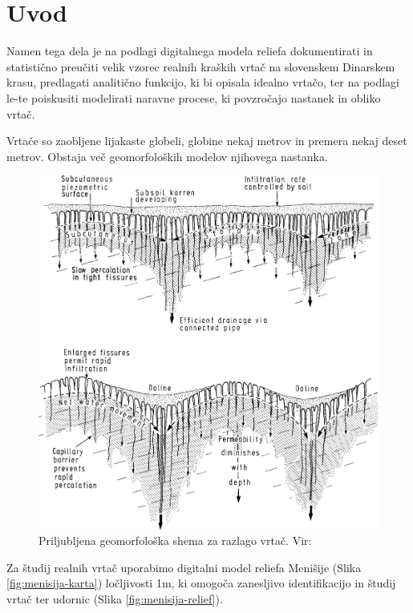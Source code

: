 \documentclass[a4paper, oneside, 12pt]{book}
\begin{document}
\mainmatter
\setcounter{page}{1}
\pagestyle{fancy}

\chapter{Uvod}
\label{ch1}
Namen tega dela je na podlagi digitalnega modela reliefa dokumentirati in statistično preučiti velik vzorec realnih kraških vrtač na slovenskem Dinarskem krasu, predlagati analitično funkcijo, ki bi opisala idealno vrtačo, ter na podlagi le-te poiskusiti modelirati naravne procese, ki povzročajo nastanek in obliko vrtač.

Vrtače so zaobljene lijakaste globeli, globine nekaj metrov in premera nekaj deset metrov. Obstaja več geomorfoloških modelov njihovega nastanka.

\begin{figure}[H]
  \begin{center}
    \includegraphics[width=13cm]{slike/vrtaca-ford-williams}
  \end{center}
  \caption{Priljubljena geomorfološka shema za razlago vrtač. Vir: \cite{ford2007karst}}
  \label{fig:vrtaca-ford-williams}
\end{figure}

Za študij realnih vrtač uporabimo digitalni model reliefa Menišije (Slika \ref{fig:menisija-karta}) ločljivosti 1m, ki omogoča zanesljivo identifikacijo in študij vrtač ter udornic (Slika \ref{fig:menisija-relief}).
\end{document}
